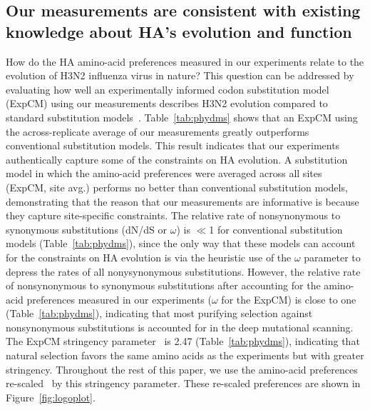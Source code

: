 \documentclass[9pt,twocolumn,twoside]{pnas-new}
\begin{document}
\subsection*{Our measurements are consistent with existing knowledge about HA's evolution and function}
How do the HA amino-acid preferences measured in our experiments relate to the evolution of H3N2 influenza virus in nature?
This question can be addressed by evaluating how well an experimentally informed codon substitution model (ExpCM) using our measurements describes H3N2 evolution compared to standard substitution models~\cite{bloom2017identification,hilton2017phydms}.
Table~\ref{tab:phydms} shows that an ExpCM using the across-replicate average of our measurements greatly outperforms conventional substitution models.
This result indicates that our experiments authentically capture some of the constraints on HA evolution.
A substitution model in which the amino-acid preferences were averaged across all sites (ExpCM, site avg.) performs no better than conventional substitution models, demonstrating that the reason that our measurements are informative is because they capture site-specific constraints.
The relative rate of nonsynonymous to synonymous substitutions (dN/dS or $\omega$) is $\ll$1 for conventional substitution models (Table~\ref{tab:phydms}), since the only way that these models can account for the constraints on HA evolution is via the heuristic use of the $\omega$ parameter to depress the rates of all nonysynonymous substitutions.
However, the relative rate of nonsynonymous to synonymous substitutions after accounting for the amino-acid preferences measured in our experiments ($\omega$ for the ExpCM) is close to one (Table~\ref{tab:phydms}), indicating that most purifying selection against nonsynonymous substitutions is accounted for in the deep mutational scanning.
The ExpCM stringency parameter~\cite{hilton2017phydms} is 2.47 (Table~\ref{tab:phydms}), indicating that natural selection favors the same amino acids as the experiments but with greater stringency.
Throughout the rest of this paper, we use the amino-acid preferences re-scaled~\cite{bloom2017identification,hilton2017phydms} by this stringency parameter.
These re-scaled preferences are shown in Figure~\ref{fig:logoplot}.
\end{document}
